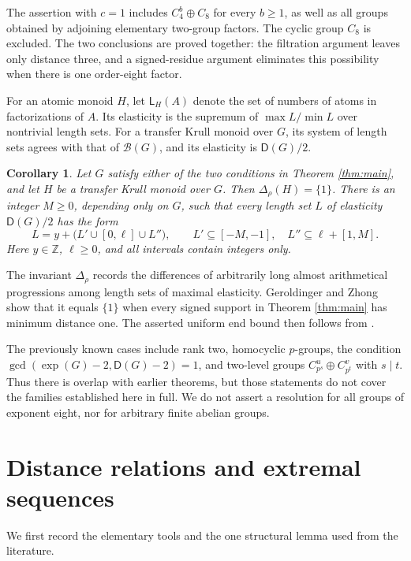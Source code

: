 \documentclass[11pt]{article}
\newtheorem{corollary}[theorem]{Corollary}
\theoremstyle{definition}
\newcommand{\D}{\mathsf D}
\newcommand{\LL}{\mathsf L}
\begin{document}
The assertion with $c=1$ includes $C_4^b\oplus C_8$ for every $b\geq1$, as well as all groups obtained by adjoining elementary two-group factors. The cyclic group $C_8$ is excluded. The two conclusions are proved together: the filtration argument leaves only distance three, and a signed-residue argument eliminates this possibility when there is one order-eight factor.

For an atomic monoid $H$, let $\LL_H(A)$ denote the set of numbers of atoms in factorizations of $A$. Its elasticity is the supremum of $\max L/\min L$ over nontrivial length sets. For a transfer Krull monoid over $G$, its system of length sets agrees with that of $\mathcal B(G)$, and its elasticity is $\D(G)/2$.

\begin{corollary}\label{cor:lengths}
Let $G$ satisfy either of the two conditions in Theorem \ref{thm:main}, and let $H$ be a transfer Krull monoid over $G$. Then $\Delta_\rho(H)=\{1\}$. There is an integer $M\geq0$, depending only on $G$, such that every length set $L$ of elasticity $\D(G)/2$ has the form
\[
 L=y+\bigl(L'\cup[0,\ell]\cup L''\bigr),\qquad
 L'\subseteq[-M,-1],\quad L''\subseteq\ell+[1,M].
\]
Here $y\in\mathbb Z$, $\ell\geq0$, and all intervals contain integers only.
\end{corollary}

The invariant $\Delta_\rho$ records the differences of arbitrarily long almost arithmetical progressions among length sets of maximal elasticity. Geroldinger and Zhong \cite[Corollary 3.3]{GZ} show that it equals $\{1\}$ when every signed support in Theorem \ref{thm:main} has minimum distance one. The asserted uniform end bound then follows from \cite[Corollary 2.3]{BGZ}.

The previously known cases include rank two, homocyclic $p$-groups, the condition $\gcd(\exp(G)-2,\D(G)-2)=1$, and two-level groups $C_{p^s}^u\oplus C_{p^t}^v$ with $s\mid t$. Thus there is overlap with earlier theorems, but those statements do not cover the families established here in full. We do not assert a resolution for all groups of exponent eight, nor for arbitrary finite abelian groups.

\section{Distance relations and extremal sequences}

We first record the elementary tools and the one structural lemma used from the literature.
\end{document}
